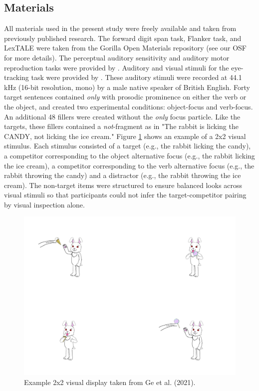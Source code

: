 \subsection{Materials}
All materials used in the present study were freely available and taken from previously published research. The forward digit span task, Flanker task, and LexTALE \citep{lemhofer2012introducing} were taken from the Gorilla \citep{Anwyl-Irvine_2019} Open Materials repository (see our OSF for more details). The perceptual auditory sensitivity and auditory motor reproduction tasks were provided by \cite{Kachlicka_Saito_Tierney_2019, saito2020domain}. Auditory and visual stimuli for the eye-tracking task were provided by \cite{Ge2021}. These auditory stimuli were recorded at 44.1 kHz (16-bit resolution, mono) by a male native speaker of British English. Forty target sentences contained \textit{only} with prosodic prominence on either the verb or the object, and created two experimental conditions: object-focus and verb-focus. An additional 48 fillers were created without the \textit{only} focus particle. Like the targets, these fillers contained a \textit{not}-fragment as in "The rabbit is licking the CANDY, not licking the ice cream." Figure \ref{fig:sampleslide} shows an example of a 2x2 visual stimulus. Each stimulus consisted of a target (e.g., the rabbit licking the candy), a competitor corresponding to the object alternative focus (e.g., the rabbit licking the ice cream), a competitor corresponding to the verb alternative focus (e.g., the rabbit throwing the candy) and a distractor (e.g., the rabbit throwing the ice cream). The non-target items were structured to ensure balanced looks across visual stimuli so that participants could not infer the target-competitor pairing by visual inspection alone.

\begin{figure}
    \centering
    \includegraphics[width=\textwidth,height=\textheight,keepaspectratio]{viz/Fig1-Geetal.jpg}
    \caption{Example 2x2 visual display taken from Ge et al. (2021).}
    \label{fig:sampleslide}
\end{figure}


